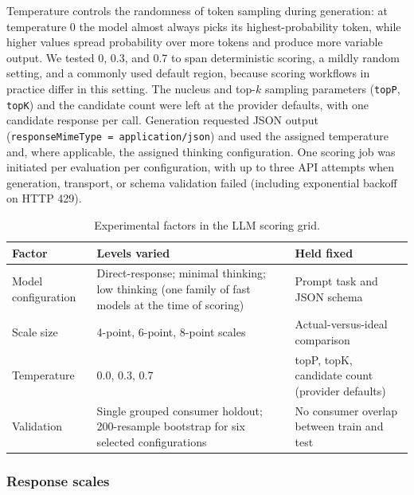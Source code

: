 \documentclass[11pt]{article}
\begin{document}
Temperature controls the randomness of token sampling during generation: at
temperature 0 the model almost always picks its highest-probability token,
while higher values spread probability over more tokens and produce more
variable output. We tested 0, 0.3, and 0.7 to span deterministic scoring, a
mildly random setting, and a commonly used default region, because scoring
workflows in practice differ in this setting. The nucleus and top-$k$ sampling
parameters (\texttt{topP}, \texttt{topK}) and the candidate count were left at
the provider defaults, with one candidate response per call. Generation
requested JSON output (\texttt{responseMimeType = application/json}) and used
the assigned temperature and, where applicable, the assigned thinking
configuration. One scoring job was initiated per evaluation per configuration,
with up to three API attempts when generation, transport, or schema validation
failed (including exponential backoff on HTTP 429).

\begin{table}[H]
\centering
\caption{Experimental factors in the LLM scoring grid.}
\label{tab:factors}
\begin{tabular}{L{1.25in}L{2.25in}L{2.15in}}
\toprule
Factor & Levels varied & Held fixed \\
\midrule
Model configuration & Direct-response; minimal thinking; low thinking (one family of fast models at the time of scoring) & Prompt task and JSON schema \\
Scale size & 4-point, 6-point, 8-point scales & Actual-versus-ideal comparison \\
Temperature & 0.0, 0.3, 0.7 & topP, topK, candidate count (provider defaults) \\
Validation & Single grouped consumer holdout; 200-resample bootstrap for six selected configurations & No consumer overlap between train and test \\
\bottomrule
\end{tabular}
\end{table}

\subsubsection{Response scales}
\label{sec:scales}
\end{document}
